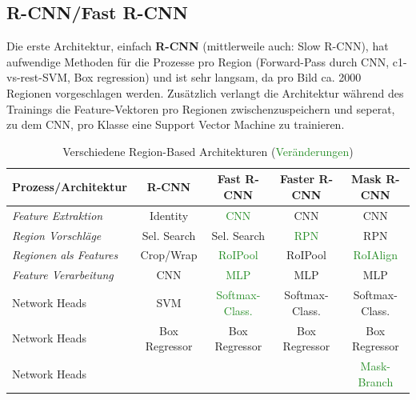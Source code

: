 \subsection{R-CNN/Fast R-CNN}
 Die erste Architektur, einfach \textbf{R-CNN} (mittlerweile auch: Slow R-CNN), hat aufwendige Methoden für die Prozesse pro Region (Forward-Pass durch CNN, c1-vs-rest-SVM, Box regression) und ist sehr langsam, da pro Bild ca. 2000 Regionen vorgeschlagen werden. Zusätzlich verlangt die Architektur während des Trainings die Feature-Vektoren pro Regionen zwischenzuspeichern und seperat, zu dem CNN, pro Klasse eine Support Vector Machine zu trainieren.\cite{girshick14CVPR}
\begin{table}[t]
\begin{tabular}{|l|c|c|c|c|}
\hline
Prozess/Architektur & \textbf{R-CNN} & \textbf{Fast R-CNN} & \textbf{Faster R-CNN} & \textbf{Mask R-CNN} \\ \hline
\textit{Feature Extraktion} & Identity & \textcolor{ForestGreen}{CNN} & CNN & CNN \\ \hline
\textit{Region Vorschläge} & Sel. Search & Sel. Search & \textcolor{ForestGreen}{RPN} & RPN\\ \hline
\textit{Regionen als Features} & Crop/Wrap & \textcolor{ForestGreen}{RoIPool} & RoIPool & \textcolor{ForestGreen}{RoIAlign}\\ \hline
\textit{Feature Verarbeitung} & CNN & \textcolor{ForestGreen}{MLP} & MLP & MLP\\ \hline

Network Heads & SVM & \textcolor{ForestGreen}{Softmax-Class.} & Softmax-Class. & Softmax-Class.\\
Network Heads & Box Regressor & Box Regressor & Box Regressor & Box Regressor\\
Network Heads & & & & \textcolor{ForestGreen}{Mask-Branch} \\ \hline

\end{tabular}
\caption{Verschiedene Region-Based Architekturen (\textcolor{ForestGreen}{Veränderungen}) \cite{generalizedrcnn}}
\label{tbl:rcnnarchtable}
\end{table}

